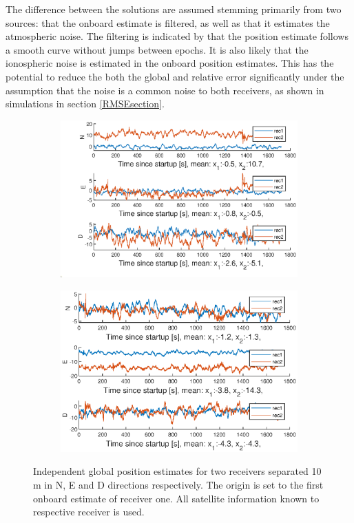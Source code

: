 \par
The difference between the solutions are assumed stemming primarily from two sources: that the onboard estimate is filtered, as well as that it estimates the atmospheric noise. The filtering is indicated by that the position estimate follows a smooth curve without jumps between epochs. It is also likely that the ionospheric noise is estimated in the onboard position estimates. This has the potential to reduce the both the global and relative error significantly under the assumption that the noise is a common noise to both receivers, as shown in simulations in section \ref{RMSEsection}.
\begin{figure}[H]
\begin{subfigure}{\textwidth}
\includegraphics[width=1\textwidth]{Results/DistNED30MinNAllSat}
\end{subfigure}
\begin{subfigure}{\textwidth}
\includegraphics[width=1\textwidth]{Results/DistNED30MinEAllSat}
\end{subfigure}
\caption{\label{fig:globalPosAllSV} Independent global position estimates for two receivers separated 10 m in N, E and D directions respectively. The origin is set to the first onboard estimate of receiver one. All satellite information known to respective receiver is used.}
\end{figure}
